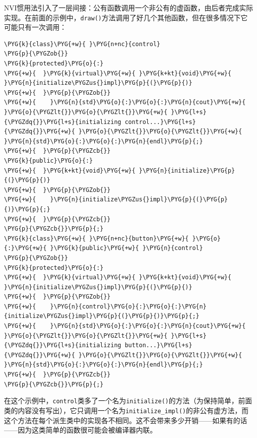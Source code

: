 
NVI惯用法引入了一层间接：公有函数调用一个非公有的虚函数，由后者完成实际实现。在前面的示例中，\texttt{draw()}方法调用了好几个其他函数，但在很多情况下它可能只有一次调用：



\begin{codeblockbg}
\begin{Verbatim}[commandchars=\\\{\},breaklines=true,breakanywhere=true,fontsize=\codefont,xleftmargin=17bp]
\PYG{k}{class}\PYG{+w}{ }\PYG{n+nc}{control}
\PYG{p}{\PYGZob{}}
\PYG{k}{protected}\PYG{o}{:}
\PYG{+w}{  }\PYG{k}{virtual}\PYG{+w}{ }\PYG{k+kt}{void}\PYG{+w}{ }\PYG{n}{initialize\PYGZus{}impl}\PYG{p}{(}\PYG{p}{)}
\PYG{+w}{  }\PYG{p}{\PYGZob{}}
\PYG{+w}{    }\PYG{n}{std}\PYG{o}{:}\PYG{o}{:}\PYG{n}{cout}\PYG{+w}{ }\PYG{o}{\PYGZlt{}}\PYG{o}{\PYGZlt{}}\PYG{+w}{ }\PYG{l+s}{\PYGZdq{}}\PYG{l+s}{initializing control...}\PYG{l+s}{\PYGZdq{}}\PYG{+w}{ }\PYG{o}{\PYGZlt{}}\PYG{o}{\PYGZlt{}}\PYG{+w}{ }\PYG{n}{std}\PYG{o}{:}\PYG{o}{:}\PYG{n}{endl}\PYG{p}{;}
\PYG{+w}{  }\PYG{p}{\PYGZcb{}}
\PYG{k}{public}\PYG{o}{:}
\PYG{+w}{  }\PYG{k+kt}{void}\PYG{+w}{ }\PYG{n}{initialize}\PYG{p}{(}\PYG{p}{)}
\PYG{+w}{  }\PYG{p}{\PYGZob{}}
\PYG{+w}{    }\PYG{n}{initialize\PYGZus{}impl}\PYG{p}{(}\PYG{p}{)}\PYG{p}{;}
\PYG{+w}{  }\PYG{p}{\PYGZcb{}}
\PYG{p}{\PYGZcb{}}\PYG{p}{;}
\PYG{k}{class}\PYG{+w}{ }\PYG{n+nc}{button}\PYG{+w}{ }\PYG{o}{:}\PYG{+w}{ }\PYG{k}{public}\PYG{+w}{ }\PYG{n}{control}
\PYG{p}{\PYGZob{}}
\PYG{k}{protected}\PYG{o}{:}
\PYG{+w}{  }\PYG{k}{virtual}\PYG{+w}{ }\PYG{k+kt}{void}\PYG{+w}{ }\PYG{n}{initialize\PYGZus{}impl}\PYG{p}{(}\PYG{p}{)}
\PYG{+w}{  }\PYG{p}{\PYGZob{}}
\PYG{+w}{    }\PYG{n}{control}\PYG{o}{:}\PYG{o}{:}\PYG{n}{initialize\PYGZus{}impl}\PYG{p}{(}\PYG{p}{)}\PYG{p}{;}
\PYG{+w}{    }\PYG{n}{std}\PYG{o}{:}\PYG{o}{:}\PYG{n}{cout}\PYG{+w}{ }\PYG{o}{\PYGZlt{}}\PYG{o}{\PYGZlt{}}\PYG{+w}{ }\PYG{l+s}{\PYGZdq{}}\PYG{l+s}{initializing button...}\PYG{l+s}{\PYGZdq{}}\PYG{+w}{ }\PYG{o}{\PYGZlt{}}\PYG{o}{\PYGZlt{}}\PYG{+w}{ }\PYG{n}{std}\PYG{o}{:}\PYG{o}{:}\PYG{n}{endl}\PYG{p}{;}
\PYG{+w}{  }\PYG{p}{\PYGZcb{}}
\PYG{p}{\PYGZcb{}}\PYG{p}{;}
\end{Verbatim}
\end{codeblockbg}



在这个示例中，\texttt{control}类多了一个名为\texttt{initialize()}的方法（为保持简单，前面类的内容没有写出），它只调用一个名为\texttt{initialize\_\allowbreak{}impl()}的非公有虚方法，而这个方法在每个派生类中的实现各不相同。这不会带来多少开销——如果有的话——因为这类简单的函数很可能会被编译器内联。


